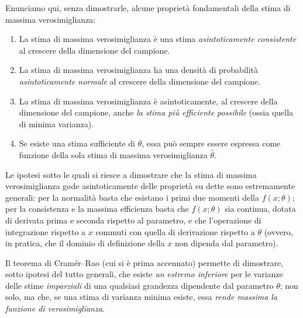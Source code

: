 Enunciamo qui, senza dimostrarle, alcune propriet\`a
fondamentali della stima di massima verosimiglianza:
\begin{enumerate}
\item La stima di massima verosimiglianza \`e una stima
  \emph{asintoticamente consistente} al crescere della
  dimensione del campione.
\item La stima di massima verosimiglianza ha una densit\`a
  di probabilit\`a \emph{asintoticamente normale} al
  crescere della dimensione del campione.
\item La stima di massima verosimiglianza \`e
  asintoticamente, al crescere della dimensione del
  campione, anche \emph{la stima pi\`u efficiente possibile}
  (ossia quella di minima varianza).
\item Se esiste una stima sufficiente di $\theta$, essa
  pu\`o sempre essere espressa come funzione della sola
  stima di massima verosimiglianza $\widehat \theta$.
\end{enumerate}%

Le ipotesi sotto le quali si riesce a dimostrare che la
stima di massima verosimiglianza gode asintoticamente delle
propriet\`a su dette sono estremamente generali: per la
normalit\`a basta che esistano i primi due momenti della
$f(x; \theta)$; per la consistenza e la massima efficienza
basta che $f(x; \theta)$ sia continua, dotata di derivata
prima e seconda rispetto al parametro, e che l'operazione di
integrazione rispetto a $x$ commuti con quella di
derivazione rispetto a $\theta$ (ovvero, in pratica, che il
dominio di definizione della $x$ non dipenda dal parametro).

Il teorema di Cram\'er--Rao%
(cui si \`e prima accennato) permette di dimostrare, sotto
ipotesi del tutto generali, che esiste \emph{un estremo
  inferiore} per le varianze delle stime \emph{imparziali}
di una qualsiasi grandezza dipendente dal parametro
$\theta$; non solo, ma che, se una stima di varianza minima
esiste, essa \emph{rende massima la funzione di
  verosimiglianza}.

